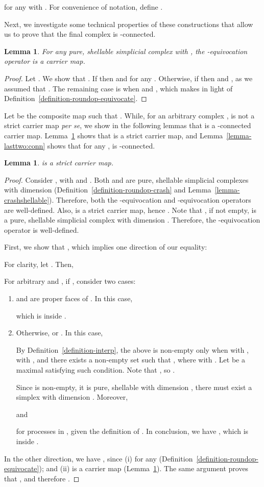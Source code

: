 \documentclass[11pt]{article}
\newtheorem{lemma}[theorem]{Lemma}
\begin{document}
for any  with .
For convenience of notation,
define .

Next, we investigate some technical properties of these constructions
that allow us to prove that the final complex is -connected.
\begin{lemma}
\label{lemma-eqv:carrier}
For any pure, shellable simplicial complex with ,
the -equivocation operator  is a carrier map.
\end{lemma}
\begin{proof}
Let .
We show that .
If  then 
and  for any .
Otherwise,
if  then  and ,
as we assumed that .
The remaining case is when
 and ,
which makes 
in light of Definition~\ref{definition-roundop-equivocate}.
\end{proof}

Let  be the composite map such that .
While,
for an arbitrary complex ,
 is not a strict carrier map \emph{per se},
we show in the following lemmas that  is a -connected carrier map.
Lemma~\ref{lemma-lasttwo:strict} shows that  is a strict carrier map,
and Lemma~\ref{lemma-lasttwo:conn} shows that
for any ,
 is -connected.

\begin{lemma}
\label{lemma-lasttwo:strict}
 is a strict carrier map.
\end{lemma}
\begin{proof}
Consider ,
with  and .
Both  and  are pure, shellable simplicial complexes with dimension 
(Definition~\ref{definition-roundop-crash} and Lemma~\ref{lemma-crashshellable}).
Therefore,
both the -equivocation and -equivocation operators are well-defined.
Also,  is a strict carrier map,
hence .
Note that ,
if not empty,
is a pure, shellable simplicial complex with dimension .
Therefore,
the -equivocation operator is well-defined.

First, we show that ,
which implies one direction of our equality:

For clarity, let . Then,

For arbitrary  and ,
if , consider two cases:
\begin{enumerate}
\item
 and  are proper faces of .
In this case,

which is inside .

\item
Otherwise,  or .
In this case,

By Definition~\ref{definition-interp},
the above is non-empty only when
 with ,
 with ,
and there exists a non-empty set 
such that ,
where  with .
Let  be a maximal  satisfying such condition.
Note that , so .

Since  is non-empty,
it is pure, shellable with dimension ,
there must exist a simplex  with dimension .
Moreover,

and

for processes in ,
given the definition of .
In conclusion, we have
,
which is inside .
\end{enumerate}

In the other direction,
we have
,
since
(i)  for any 
(Definition~\ref{definition-roundop-equivocate});
and (ii)
 is a carrier map (Lemma~\ref{lemma-eqv:carrier}).
The same argument proves that ,
and therefore .
\end{proof}
\end{document}
